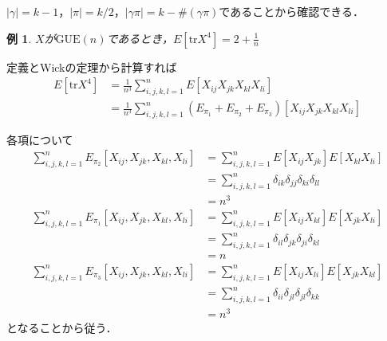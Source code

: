\documentclass{ltjsarticle}
\makeatletter
\theoremstyle{mystyle1}
\theoremstyle{mystyle2}
\newtheorem{example}{例}
\theoremstyle{mystyle3}
\renewenvironment{proof}[1][\proofname]{\par
  \pushQED{\qed}%
  \normalfont
  \topsep6\p@\@plus6\p@ \trivlist
  \item[\hskip\labelsep{\bfseries\sffamily #1}]\ignorespaces
}{%
  \popQED\endtrivlist\@endpefalse
}
\renewcommand\proofname{証明}
\makeatother
\begin{document}
\begin{proof}
    $|\gamma|=k-1$，$|\pi|=k/2$，$|\gamma\pi|=k-\#(\gamma\pi)$であることから確認できる．
\end{proof}

\begin{example}
    $X$が$\mathrm{GUE}(n)$であるとき，$E[\mathrm{tr}X^4]=2+\frac{1}{n}$
\end{example}

\begin{proof}
    定義とWickの定理から計算すれば
    \begin{equation}
        \begin{split}
            E[\mathrm{tr}X^4]
            &=\frac{1}{n^3}\sum_{i,j,k,l=1}^nE[X_{ij}X_{jk}X_{kl}X_{li}] \\
            &=\frac{1}{n^3}\sum_{i,j,k,l=1}^n(E_{\pi_1}+E_{\pi_2}+E_{\pi_3})[X_{ij}X_{jk}X_{kl}X_{li}]
        \end{split}
    \end{equation}

    各項について
    \begin{equation}
        \begin{split}
            \sum_{i,j,k,l=1}^n E_{\pi_2}[X_{ij},X_{jk},X_{kl},X_{li}]
            &=\sum_{i,j,k,l=1}^n E[X_{ij}X_{jk}]E[X_{kl}X_{li}] \\
            &=\sum_{i,j,k,l=1}^n \delta_{ik}\delta_{jj}\delta_{ki}\delta_{ll} \\
            &=n^3
        \end{split}
    \end{equation}
    \begin{equation}
        \begin{split}
            \sum_{i,j,k,l=1}^n E_{\pi_1}[X_{ij},X_{jk},X_{kl},X_{li}]
            &=\sum_{i,j,k,l=1}^n E[X_{ij}X_{kl}]E[X_{jk}X_{li}] \\
            &=\sum_{i,j,k,l=1}^n \delta_{il}\delta_{jk}\delta_{ji}\delta_{kl} \\
            &=n
        \end{split}
    \end{equation}
    \begin{equation}
        \begin{split}
            \sum_{i,j,k,l=1}^n E_{\pi_3}[X_{ij},X_{jk},X_{kl},X_{li}]
            &=\sum_{i,j,k,l=1}^n E[X_{ij}X_{li}]E[X_{jk}X_{kl}] \\
            &=\sum_{i,j,k,l=1}^n \delta_{ii}\delta_{jl}\delta_{jl}\delta_{kk} \\
            &=n^3
        \end{split}
    \end{equation}
    となることから従う．


\end{proof}
\end{document}
